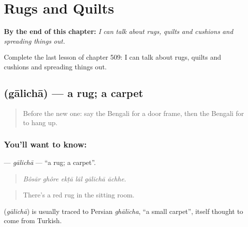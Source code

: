 
\chapter{Rugs and Quilts}
\label{ch:bn-rugs-and-quilts}

\begin{chapteropening}
\textbf{By the end of this chapter:} \emph{I can talk about rugs, quilts and cushions and spreading things out.}

Complete the last lesson of chapter 509: I can talk about rugs, quilts and cushions and spreading things out.
\end{chapteropening}

\section[\texorpdfstring{\bn{গালিচা} (gālichā)}{গালিচা (gālichā)}]{ (gālichā) — a rug; a carpet}

\label{lesson:BN-C509-galicha}



\begin{quote}
Before the new one: say the Bengali for a door frame, then the Bengali for to hang up.
\end{quote}

\subsection*{You'll want to know: }
\textbf{} — \emph{gālichā} — \textquotedblleft{}a rug; a carpet\textquotedblright{}.

\begin{quote}
     
\end{quote}

\begin{quote}
\emph{Bôsār ghôre ekṭā lāl gālichā āchhe.}
\end{quote}

\begin{quote}
There's a red rug in the sitting room.
\end{quote}

\begin{cousinweb}
\textbf{} (\emph{gālichā}) is usually traced to Persian \emph{ghālīcha}, \textquotedblleft{}a small carpet\textquotedblright{}, itself thought to come from Turkish.
\end{cousinweb}

